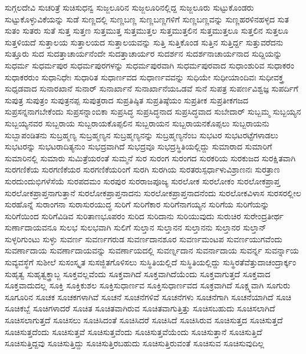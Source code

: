 {ಸುಗ್ಗಲದೇವಿ
ಸುಚರಿತ್ರೆ
ಸುಚಿಸುಧನ್ವ
ಸುಜ್ಜಲೂರಿನ
ಸುಜ್ಜಲೂರಿನಲ್ಲಿದ್ದ
ಸುಜ್ಜಲೂರು
ಸುಟ್ಟುಕೊಂಡರು
ಸುಟ್ಟುಕೊಳ್ಳುವಿಕೆಯನ್ನು
ಸುಡೆ
ಸುಣ್ಣದಲ್ಲಿ
ಸುಣ್ಣಬಣ್ಣ
ಸುಣ್ಣಬಣ್ಣಗಳಿಗೆ
ಸುಣ್ಣಬಣ್ಣವನ್ನು
ಸುಣ್ಣಹರಳಿನಹಳ್ಳದ
ಸುತ
ಸುತಂ
ಸುತರು
ಸುತೆ
ಸುತ್ತ
ಸುತ್ತಣ
ಸುತ್ತಮುತ್ತ
ಸುತ್ತಮುತ್ತಲ
ಸುತ್ತಮುತ್ತಲಿನ
ಸುತ್ತಮುತ್ತಲೂ
ಸುತ್ತಲಿನ
ಸುತ್ತಲೂ
ಸುತ್ತಳಿಯದೆ
ಸುತ್ತಾಲಯ
ಸುತ್ತಾಲಯದ
ಸುತ್ತಾಲಯವನ್ನು
ಸುತ್ತಿ
ಸುತ್ತಿಕೊಂಡ
ಸುತ್ತಿನ
ಸುತ್ತಿರ್ದ್ದ
ಸುತ್ತುವರೆದನು
ಸುತ್ತೂರು
ಸುದ
ಸುದತ್ತಾಚಾರ್ಯನೆಂದೇ
ಸುದತ್ತಾಚಾರ್ಯರ
ಸುದರ್ಶನ
ಸುದರ್ಶನಾಚಾರ್ಯನಾದ
ಸುದ್ದಿಯನ್ನು
ಸುಧರ್ಮ
ಸುಧರ್ಮಪುರ
ಸುಧರ್ಮಪುರಗಳನ್ನು
ಸುಧರ್ಮಪುರವಾಗಿ
ಸುಧರ್ಮಪುರವಾದ
ಸುಧಾಂಶುರಿವ
ಸುಧಾಕರಂ
ಸುಧಾಕರರುಂ
ಸುಧಾನಿಧೇಃ
ಸುಧಾರಿತ
ಸುಧಾರ್ಣವದ
ಸುಧಾರ್ಣವವನ್ನು
ಸುಧಿಯೇ
ಸುಧೀಯಾಂದಿವಃ
ಸುಧೀವಕ್ತ್ರ
ಸುಧೃಡವಾದ
ಸುನಾರಖಾನೆ
ಸುನಾರ್
ಸುನಾರ್ಖಾನೆ
ಸುನಾರ್ಖಾನೆಯಒಡವೆ
ಸುನೆ
ಸುಪತ್ರ
ಸುಪರ್ಣವಿಶ್ವಜ್ಞ
ಸುಪರ್ದಿಗೆ
ಸುಪುತ್ರ
ಸುಪುತ್ರಂ
ಸುಪುತ್ರನಪ್ಪ
ಸುಪುತ್ರರಾದ
ಸುಪ್ರತಿಷ್ಠಿತ
ಸುಪ್ರತಿಷ್ಠೆಯಂ
ಸುಪ್ರತೀಕ
ಸುಪ್ರತೀಕಗಜದ
ಸುಪ್ರಸನ್ನನಾಗಬೇಕೆಂದು
ಸುಪ್ರಸನ್ನಾಂಬಿಕಾ
ಸುಪ್ರಸಿದ್ಧ
ಸುಪ್ರಸಿದ್ಧನಾದ
ಸುಪ್ರಸಿದ್ಧವಾದ
ಸುಬೇದಾರ್
ಸುಬ್ಬಮ್ಮ
ಸುಬ್ಬಯ್ಯನ
ಸುಬ್ಬಯ್ಯನವರ
ಸುಬ್ಬರಾಯ
ಸುಬ್ಬರಾಯಕೊಪ್ಪಲಿನ
ಸುಬ್ಬರಾಯನ
ಸುಬ್ಬರಾಯನಕೊಪ್ಪಲು
ಸುಬ್ಬರಾಯನು
ಸುಬ್ಬಾಪಂಡಿತನು
ಸುಬ್ರಹ್ಮಣ್ಯ
ಸುಬ್ರಹ್ಮಣ್ಯನ
ಸುಬ್ರಹ್ಮಣ್ಯನನ್ನು
ಸುಬ್ರಹ್ಮಣ್ಯನೆಂಬ
ಸುಭಟರ
ಸುಭಟರಟ್ಟೆಗಳಾಡಲು
ಸುಭಟರನ್ನು
ಸುಭಟರಾದಿತ್ಯನುಂ
ಸುಭದ್ರವಾಗಿದೆ
ಸುಭದ್ರವೂ
ಸುಭದ್ರಸ್ಥಿತಿಯಲ್ಲಿದ್ದು
ಸುಮಾರಾದ
ಸುಮಾರಿಗೆ
ಸುಮಾರಿನಲ್ಲಿ
ಸುಮಾರು
ಸುಮಿತ್ರೆಯರಂತೆ
ಸುಮ್ಮನೆ
ಸುರ
ಸುರಂಗ
ಸುರಂಗದ
ಸುರಕರಿಯ
ಸುರಕುಜದ
ಸುರಕ್ಷಿತವಾಗಿ
ಸುರಗಣಿಕೆಯ
ಸುರಗಣಿಕೆಯರ
ಸುರಗಣಿಕೆಯರಿಂಗೆ
ಸುರಗಿ
ಸುರಗಿಯ
ಸುರತರುಸ್ಪರ್ಧಾಳುವಿಶ್ರಾಣನಃ
ಸುರತ್ರಾಣ
ಸುರದುಂದುಭಿಗಳೆಸೆಯೆ
ಸುರಪದಮಂ
ಸುರಪುರ
ಸುರರಾಜಪೂಜ್ಯ
ಸುರಲೋಕ
ಸುರಲೋಕಂ
ಸುರಲೋಕಪ್ರಾಪ್ತ
ಸುರಲೋಕಪ್ರಾಪ್ತನಾಗುತ್ತಾನೆ
ಸುರಲೋಕಪ್ರಾಪ್ತನಾದನು
ಸುರಲೋಕಪ್ರಾಪ್ತನಾದನೆಂದು
ಸುರಲೋಕವಿಳಾಸ
ಸುರಸರಲ್ಲೀಲ
ಸುರಹೊನ್ನೆ
ಸುರಾಂಗನಾ
ಸುರಾಸುರಯುದ್ಧ
ಸುರಿಗೆ
ಸುರಿಗೆಕಾರ
ಸುರಿಗೆನಾಗಯ್ಯನ
ಸುರಿಗೆಯ
ಸುರಿಗೆಯನ್ನು
ಸುರಿಗೆಯಿಂದ
ಸುರಿಗೆವಿಡಿವ
ಸುರಿತಾಣಭೂಪರಂ
ಸುರಿದ
ಸುರಿದಾನು
ಸುರಿಯುವುದು
ಸುರುಚಿರ
ಸುರೇಂದ್ರತೀರ್ಥ
ಸುರ್ಣಾದಾಯವನೂ
ಸುಲಭ
ಸುಲಭವಾಗಿ
ಸುಲಿಗೆ
ಸುಲ್ತಾನ
ಸುಲ್ತಾನನ
ಸುಲ್ತಾನನು
ಸುಲ್ತಾನರ
ಸುಲ್ತಾನ್
ಸುಳ್ಳರಿಗುಂಟು
ಸುಳ್ಳು
ಸುವರ್ಣ
ಸುವರ್ಣಗರುಡ
ಸುವರ್ಣದಾನಶೂರ
ಸುವರ್ಣಮಂಟಪ
ಸುವರ್ಣಯುಗವೆಂದು
ಸುವರ್ಣಾದಾಯ
ಸುವರ್ಣಾದಾಯವನ್ನು
ಸುವರ್ಣಾಯದಲ್ಲಿ
ಸುವರ್ಣ್ನದಾನ
ಸುವರ್ನಾದಾಯ
ಸುವರ್ನ್ನ
ಸುವರ್ನ್ನಾಯ
ಸುವ್ಯವಸ್ಥೆಗೆ
ಸುಶೀಲೆ
ಸುಸಂಸ್ಕೃತ
ಸುಸಜ್ಜಿತಗೊಳಿಸಲು
ಸುಸ್ಥಿತಿಯಲ್ಲಿದೆ
ಸುಸ್ಥಿತಿಯಲ್ಲಿದ್ದು
ಸುಸ್ಥಿರತೆವೆತ್ತುದಾಚಂದ್ರಾರ್ಕ್ಕಂ
ಸುಹೃತ್ವ
ಸುಹೃತ್ವಕ್ತ್ರಾಬ್ಜ
ಸೂಕ್ತವಲ್ಲವೆಂದು
ಸೂಕ್ತವಾಗಿದೆ
ಸೂಕ್ತವಾಗಿದೆಯೆಂದು
ಸೂಕ್ತವಾಗುತ್ತದೆ
ಸೂಕ್ತವಾದ
ಸೂಕ್ತವಾದುದಲ್ಲ
ಸೂಕ್ತಿ
ಸೂಕ್ತಿಕುಶಲ
ಸೂಕ್ತಿಸುಧಾರ್ಣವ
ಸೂಕ್ತಿಸುಧಾರ್ಣವದ
ಸೂಕ್ರವಾಗಿದೆ
ಸೂಕ್ಷ್ಮವಾಗಿ
ಸೂಗುರು
ಸೂಗೂರಿನ
ಸೂಚಕ
ಸೂಚಕಗಳಾಗಿವೆ
ಸೂಚನೆ
ಸೂಚನೆಗಳಿವೆ
ಸೂಚನೆಗಳು
ಸೂಚನೆಗಾಗಿ
ಸೂಚನೆಯಾಗಿದೆ
ಸೂಚಿ
ಸೂಚಿಕಬ್ಬೆ
ಸೂಚಿಗಳಾದರೆ
ಸೂಚಿತ
ಸೂಚಿತವಾಗಿರುವ
ಸೂಚಿತವಾಗುತ್ತಿತ್ತು
ಸೂಚಿಸಬಹುದು
ಸೂಚಿಸಲಾಗಿದೆ
ಸೂಚಿಸಲಾಗುತ್ತದೆ
ಸೂಚಿಸಲು
ಸೂಚಿಸಿದಂತೆ
ಸೂಚಿಸಿದರೆ
ಸೂಚಿಸಿದೆ
ಸೂಚಿಸಿರುವ
ಸೂಚಿಸುತ್ತದ
ಸೂಚಿಸುತ್ತದೆ
ಸೂಚಿಸುತ್ತದೆಂದು
ಸೂಚಿಸುತ್ತವೆ
ಸೂಚಿಸುತ್ತವೆಂದು
ಸೂಚಿಸುತ್ತವೆಯೆಂದು
ಸೂಚಿಸುತ್ತಾನೆ
ಸೂಚಿಸುತ್ತಿದೆ
ಸೂಚಿಸುತ್ತಿದ್ದವು
ಸೂಚಿಸುತ್ತಿದ್ದು
ಸೂಚಿಸುತ್ತಿರಬಹುದು
ಸೂಚಿಸುತ್ತಿರುವಂತೆ
ಸೂಚಿಸುವ
ಸೂಚಿಸುವುದಿಲ್ಲ
}
